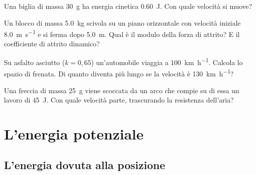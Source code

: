 \begin{esercizio}
Una biglia di massa \SI{30}{\gram} ha energia cinetica \SI{0,60}{\joule}. Con quale velocità si muove?\\
\end{esercizio}

\begin{esercizio}
Un blocco di massa \SI{5,0}{\kilo\gram} scivola su un piano orizzontale con velocità iniziale \SI{8,0}{\metre\per\second} e si ferma dopo \SI{5,0}{\metre}. Qual è il modulo della forza di attrito? E il coefficiente di attrito dinamico?\\
\end{esercizio}

\begin{esercizio}
Su asfalto asciutto ($k = 0{,}65$) un'automobile viaggia a \SI{100}{\kilo\metre\per\hour}. Calcola lo spazio di frenata. Di quanto diventa più lungo se la velocità è \SI{130}{\kilo\metre\per\hour}?\\
\end{esercizio}

\begin{esercizio}
Una freccia di massa \SI{25}{\gram} viene scoccata da un arco che compie su di essa un lavoro di \SI{45}{\joule}. Con quale velocità parte, trascurando la resistenza dell'aria?\\
\end{esercizio}

\section{L'energia potenziale}

\subsection{L'energia dovuta alla posizione}

